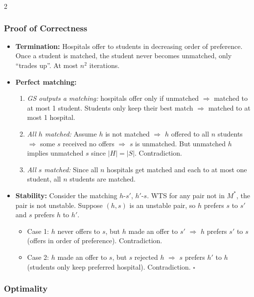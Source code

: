 \documentclass[9pt]{article}
\begin{document}
\begin{multicols}{2}
\subsubsection*{Proof of Correctness}

\begin{itemize}
  \item \textbf{Termination:} Hospitals offer to students in decreasing order of preference. Once a student is matched, the student never becomes unmatched, only ``trades up''. At most $n^2$ iterations.
  \item \textbf{Perfect matching:}
  \begin{enumerate}
    \item \textit{GS outputs a matching:} hospitals offer only if unmatched $\Rightarrow$ matched to at most 1 student. Students only keep their best match $\Rightarrow$ matched to at most 1 hospital.
    \item \textit{All $h$ matched:} Assume $h$ is not matched $\Rightarrow$ $h$ offered to all $n$ students $\Rightarrow$ some $s$ received no offers $\Rightarrow$ $s$ is unmatched. But unmatched $h$ implies unmatched $s$ since $|H|=|S|$. Contradiction.
    \item \textit{All $s$ matched:} Since all $n$ hospitals get matched and each to at most one student, all $n$ students are matched.
  \end{enumerate}
  \item \textbf{Stability:} Consider the matching $h$-$s'$, $h'$-$s$. WTS for any pair not in $M^*$, the pair is not unstable. Suppose $(h,s)$ is an unstable pair, so $h$ prefers $s$ to $s'$ and $s$ prefers $h$ to $h'$.
  \begin{itemize}
    \item Case 1: $h$ never offers to $s$, but $h$ made an offer to $s'$ $\Rightarrow$ $h$ prefers $s'$ to $s$ (offers in order of preference). Contradiction.
    \item Case 2: $h$ made an offer to $s$, but $s$ rejected $h$ $\Rightarrow$ $s$ prefers $h'$ to $h$ (students only keep preferred hospital). Contradiction. $\square$
  \end{itemize}
\end{itemize}

\subsubsection*{Optimality}


\end{multicols}
\end{document}
